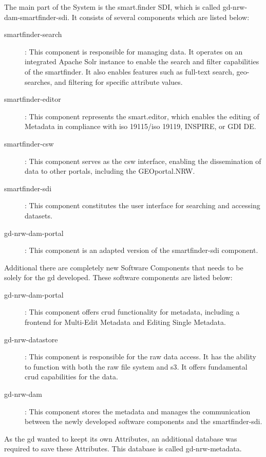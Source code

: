\documentclass[11pt, titlepage, a4paper]{article}
\begin{document}
The main part of the System is the smart.finder SDI, which is called gd-nrw-dam-smartfinder-sdi. It consists of several components which are listed below:
\begin{description}
    \item[smartfinder-search]: This component is responsible for managing data. It operates on an integrated Apache Solr instance to enable the search and filter capabilities of the smartfinder. It also enables features such as full-text search, geo-searches, and filtering for specific attribute values.
    \item[smartfinder-editor]: This component represents the smart.editor, which enables the editing of Metadata in compliance with \gls{iso} 19115/\gls{iso} 19119, INSPIRE, or GDI DE.
    \item[smartfinder-csw]: This component serves as the \gls{csw} interface, enabling the dissemination of data to other portals, including the GEOportal.NRW.
    \item[smartfinder-sdi]: This component constitutes the user interface for searching and accessing datasets.
    \item[gd-nrw-dam-portal]: This component is an adapted version of the smartfinder-sdi component.
          
\end{description}
Additional there are completely new Software Components that needs to be solely for the \gls{gd} developed. These software components are listed below: 
\begin{description}      
    \item[gd-nrw-dam-portal]: This component offers \gls{crud} functionality for metadata, including a frontend for Multi-Edit Metadata and Editing Single Metadata.
    \item[gd-nrw-datastore]: This component is responsible for the raw data access. It has the ability to function with both the raw file system and \gls{s3}. It offers fundamental \gls{crud} capabilities for the data.
    \item[gd-nrw-dam]: This component stores the metadata and manages the communication between the newly developed software components and the smartfinder-sdi.
\end{description}




As the \gls{gd}  wanted to keept its own Attributes, an additional database was required to save these Attributes.  This database  is called gd-nrw-metadata. %
\end{document}
